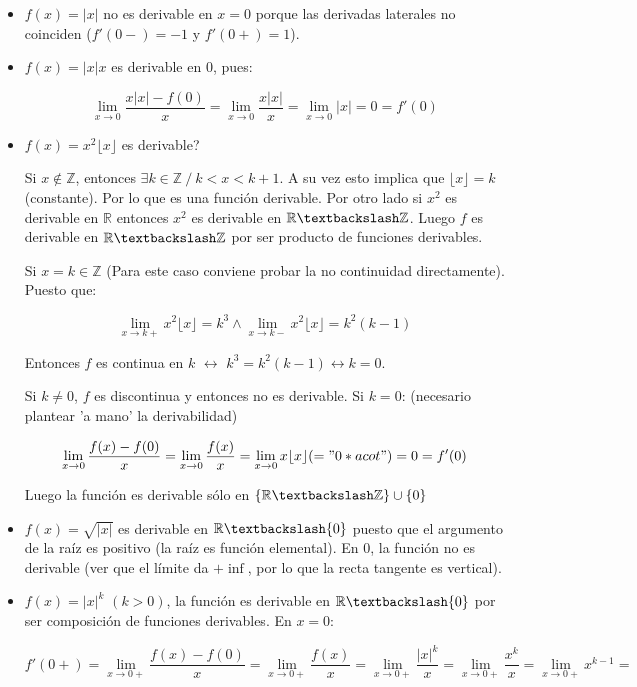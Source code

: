 \documentclass{report}
\begin{document}
			\begin{itemize}
				\item $f(x)=|x|$ no es derivable en $x=0$ porque las derivadas laterales no coinciden ($f'(0-)=-1$ y $f'(0+)=1$).
				\item $f(x)=|x|x$ es derivable en 0, pues:
				
				$$\lim_{x \to 0} \frac{x|x|-f(0)}{x} = \lim_{x \to 0} \frac{x|x|}{x} = \lim_{x \to 0}|x| = 0 = f'(0)$$
				
				\item $f(x)=x^2\lfloor x \rfloor$ es derivable?
				
				Si $x \notin \mathbb{Z}$, entonces $\exists k \in \mathbb{Z} \ / \ k < x <k+1$. A su vez esto implica que $\lfloor x \rfloor = k$ (constante). Por lo que es una función derivable. Por otro lado si $x^2$ es derivable en $\mathbb{R}$ entonces $x^2$ es derivable en $\mathbb{R\textbackslash Z}$. Luego $f$ es derivable en  $\mathbb{R\textbackslash Z}$ por ser producto de funciones derivables.
				
				Si $x =k \in \mathbb{Z}$ (Para este caso conviene probar la no continuidad directamente). Puesto que:
				
				$$\lim_{x\to k+}{x^2 \lfloor x \rfloor}=k^3 \wedge \lim_{x\to k-}{x^2 \lfloor x \rfloor}=k^2(k-1)$$
				
				Entonces $f$ es continua en $k$ $\leftrightarrow$ $k^3=k^2(k-1) \leftrightarrow k=0$.
				
				Si $k\neq 0$, $f$ es discontinua y entonces no es derivable. Si $k = 0$: (necesario plantear 'a mano' la derivabilidad)
				
				$$\lim_{x \to 0}\frac{f(x)-f(0)}{x} = \lim_{x \to 0}\frac{f(x)}{x} = \lim_{x \to 0}x \lfloor x \rfloor (= "0*acot") = 0 = f'(0)$$
				
				Luego la función es derivable sólo en $\{\mathbb{R}\textbackslash \mathbb{Z}\} \cup \{0\}$
				
				\item $f(x)=\sqrt{|x|}$ es derivable en $\mathbb{R}\textbackslash \{0\}$ puesto que el argumento de la raíz es positivo (la raíz es función elemental). En 0, la función no es derivable (ver que el límite da $+ \inf$, por lo que la recta tangente es vertical).
				
				\item $f(x)=|x|^{k}$ $(k>0)$, la función es derivable en $\mathbb{R}\textbackslash \{0\}$ por ser composición de funciones derivables. En $x=0$:
				
				$$f'(0+) = \lim_{x \to 0+}{\frac{f(x)-f(0)}{x}} = \lim_{x \to 0+}{\frac{f(x)}{x}} = \lim_{x \to 0+}{\frac{|x|^{k}}{x}} = \lim_{x \to 0+}{\frac{x^{k}}{x}} = \lim_{x \to 0+}{x^{k-1}} = $$
				

\end{itemize}
\end{document}
